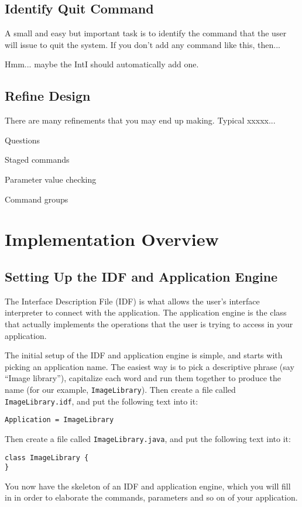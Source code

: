 \documentclass[11pt]{report}
\begin{document}
\subsection{Identify Quit Command}

A small and easy but important task is to identify the command
that the user will issue to quit the system.  If you don't add
any command like this, then...

Hmm... maybe the IntI should automatically add one.

\subsection{Refine Design}

There are many refinements that you may end up making.  Typical xxxxx...

Questions

Staged commands

Parameter value checking

Command groups

\section{Implementation Overview}

\subsection{Setting Up the IDF and Application Engine}

The Interface Description File (IDF) is what allows the user's
interface interpreter to connect with the application.  The
application engine is the class that actually implements the
operations that the user is trying to access in your application.

The initial setup of the IDF and application engine is simple,
and starts with picking an application name.
The easiest way is to pick a descriptive phrase (say ``Image library''),
capitalize each word and run them together to produce the
name (for our example, {\tt ImageLibrary}).  Then create a file
called {\tt ImageLibrary.idf}, and put the following text into it:
\begin{verbatim}
Application = ImageLibrary
\end{verbatim}
Then create a file called {\tt ImageLibrary.java}, and put the
following text into it:
\begin{verbatim}
class ImageLibrary {
}
\end{verbatim}
You now have the skeleton of an IDF and application engine,
which you will fill in in order to elaborate the commands,
parameters and so on of your application.
\end{document}
